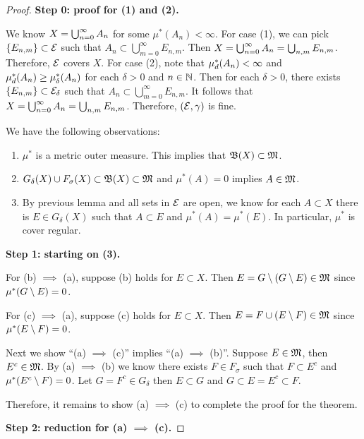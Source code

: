\documentclass[a4paper]{article}
\begin{document}
\begin{proof}

\textbf{Step 0: proof for (1) and (2).} 

We know $X = \bigcup_{n=0}^\infty A_n$ for some $\mu^* 
(A_n) < \infty$. For case (1), we can pick $\left\{ E_{n, m} \right\}
\subset \mathcal{E}$ 
such that $A_n \subset \bigcup_{m=0}^\infty E_{n, m}$. Then 
$X = \bigcup_{n=0}^\infty A_n = \bigcup_{n, m} E_{n, m}$. Therefore, 
$\mathcal{E}$ covers $X$.
For case (2), note that $\mu^*_d(A_n) < \infty$ 
and $\mu^*_d(A_n) \geq \mu^*_\delta(A_n)$ 
for each $\delta > 0$ and $n \in \mathbb{N}$.
Then for each $\delta > 0$, 
there exists $\left\{ E_{n, m} \right\} \subset \mathcal{E}_\delta$
such that $A_n \subset \bigcup_{m=0}^\infty E_{n, m}$.
It follows that
$X = \bigcup_{n=0}^\infty A_n = \bigcup_{n, m} E_{n, m}$. Therefore, 
$(\mathcal{E}, \gamma)$ is fine.

We have the following observations: 
\begin{enumerate}
  \item $\mu^*$ is a metric outer measure. This implies that 
  $\mathfrak{B}(X) \subset \mathfrak{M}$. 
  \item $G_\delta(X) \cup F_\sigma(X) \subset \mathfrak{B}(X) \subset \mathfrak{M}$
  and $\mu^*(A) = 0$ implies $A \in \mathfrak{M}$.
  \item By previous lemma and all sets in $\mathcal{E}$ are open, 
  we know for each $A \subset X$ there is $E \in G_\delta(X)$
  such that $A \subset E$ and $\mu^*(A) = \mu^*(E)$. 
  In particular, $\mu^*$ is cover regular.
\end{enumerate}

\textbf{Step 1: starting on (3).} 

For (b) $\implies$ (a), suppose (b) holds for $E \subset X$.
Then $E = G \setminus (G \setminus E) \in \mathfrak{M}$ since 
$\mu^*(G \setminus E) = 0$.

For (c) $\implies$ (a), suppose (c) holds for $E \subset X$. 
Then $E = F \cup (E \setminus F) \in \mathfrak{M}$ since 
$\mu^*(E \setminus F) = 0$.

Next we show ``(a) $\implies$ (c)'' implies 
``(a) $\implies$ (b)''. Suppose $E \in \mathfrak{M}$, then 
$E^c \in \mathfrak{M}$. By (a) $\implies$ (b) we know there exists 
$F \in F_\sigma$ such that $F \subset E^c$ and 
$\mu^*(E^c \setminus F) = 0$. Let $G = F^c \in G_\delta$ 
then $E \subset G$ and $G \subset E = E^c \subset F$.

Therefore, it remains to show (a) $\implies$ (c) to complete 
the proof for the theorem. 

\textbf{Step 2: reduction for (a) $\implies$ (c).}


\end{proof}
\end{document}
